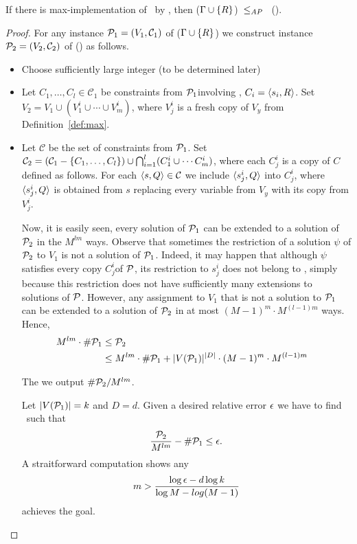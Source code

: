 \begin{theorem}\label{theo:max}
If there is max-implementation of \mR\ by \mrelset, then \ccsp(\(\Gamma \cup \{{R}\}\))~\(\le_{AP}\)~
\ccsp(\mrelset)\@.

\begin{proof}
For any instance \(\mathcal{P}_1 = (V_1,\mathcal{C}_1)\) of  \ccsp(\(\Gamma \cup \{{R}\}\)) we
construct instance \(\mathcal{P}_2 = (V_2,\mathcal{C}_2)\) of  \ccsp(\mrelset) as follows.
\begin{itemize}
\item Choose sufficiently large integer \mm(to be determined later)
\item Let \(C_1,\dotsc,C_l\in\mathcal{C}_1\) be constraints from \(\mathcal{P}_1\)involving
\mR, \(C_i=\langle s_i,R  \rangle\)\@. Set \(V_2 =V_1\cup(V_1^i\cup\dotsb \cup V_m^i)\), where \(V_j^i\)
is a fresh copy of \(V_y\) from Definition~\ref{def:max}\@.
\item Let \(\mathcal{C}\) be the set of constraints from \(\mathcal{P}_1\). Set 
\(\mathcal{C}_2 = (\mathcal{C}_1 - \{{C_1,\dotsc,C_l}\}) \cup 
\bigcap_{i=1}^{l}(C_1^i\cup\dotsb C_m^i)\), where each \(C_j^i\) is a copy of \(C\) defined
as follows. For each \(\langle s,Q \rangle\in \mathcal{C}\) we include \(\langle s_j^i,Q \rangle\) into 
\(C_j^i\), where \(\langle s_j^i,Q \rangle\) is obtained from \(s\) replacing every variable from 
\(V_y\) with its copy from \(V_j^i\)\@.

Now, it is easily seen, every solution of \(\mathcal{P}_1\) can be extended to a solution of \(\mathcal{P}_2\)
in the \(M^{lm}\) ways. Observe that sometimes the restriction of a solution \(\psi\)
of \(\mathcal{P}_2\) to \(V_1\) is not a solution of \(\mathcal{P}_1\)\@. Indeed, it may happen that
although \(\psi\) satisfies every copy \(C_j^i\)of \(\mathcal{P}\), its restriction to \(s_j^i\)
does not belong to \mR, simply because this restriction does not have sufficiently many extensions 
to solutions of \(\mathcal{P}\)\@. However, any assignment to \(V_1\) that is not a solution to
\(\mathcal{P}_1\) can be extended to a solution of \(\mathcal{P}_2\) in at most \((M-1)^m\cdot M^{(l-1)m}\)
ways. Hence, 
\begin{align*}
M^{lm}\cdot \#\mathcal{P}_1 & \le  \mathcal{P}_2  & \\
& \le  M^{lm}	\cdot \#\mathcal{P}_1 + |V(\mathcal{P}_1)|^{|D|} \cdot (M-1)^m \cdot M^{(l-1)m} & \\
\end{align*}

The we output \(\#\mathcal{P}_2/M^{lm}\)\@.

Let \(|V(\mathcal{P}_1)| = k \) and \(D=d\)\@. Given a desired relative error \(\epsilon\) we have to find \mm\ 
such that 
\[\frac{\mathcal{P}_2}{M^{lm}} - \#\mathcal{P}_1 \le \epsilon.\]
A straitforward computation shows any 
\[m > \frac{\log \epsilon - d \log k}{\log M - log(M-1)}\]
achieves the goal.


\end{itemize}
\end{proof}


\end{theorem}